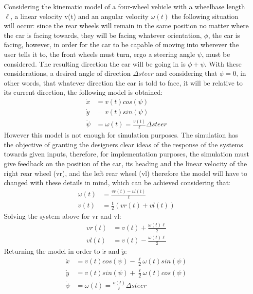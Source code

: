 Considering the kinematic model of a four-wheel vehicle with a wheelbase length $\ell$, a linear velocity v(t) and an angular velocity $\omega(t)$ the following situation will occur: since the rear wheels will remain in the same position no matter where the car is facing towards, they will be facing whatever orientation, $\phi$, the car is facing, however, in order for the car to be capable of moving into wherever the user tells it to, the front wheels must turn, ergo a steering angle $\psi$, must be considered. The resulting direction the car will be going in is $\phi + \psi$. With these considerations, a desired angle of direction $\Delta steer$ and considering that $\phi=0$, in other words, that whatever direction the car is told to face, it will be relative to its current direction, the following model is obtained:
\begin{align}
\dot{x}&=v(t) cos(\psi)\\
\dot{y}&=v(t) sin(\psi)\\
\dot{\psi}&=\omega(t)=\frac{v(t)}{\ell}\Delta steer
\end{align}
However this model is not enough for simulation purposes. The simulation has the objective of granting the designers clear ideas of the response of the systems towards given inputs, therefore, for implementation purposes, the simulation must give feedback on the position of the car, its heading and the linear velocity of the right rear wheel (vr), and the left rear wheel (vl) therefore the model will have to changed with these details in mind, which can be achieved considering that:
\begin{align}
\omega(t)&=\frac{vr(t)-vl(t)}{\ell}\\
v(t)&=\frac{1}{2}(vr(t)+vl(t))
\end{align}
Solving the system above for vr and vl:
\begin{align}
vr(t)&=v(t)+ \frac{\omega(t)\ell}{2}\\
vl(t)&=v(t)-\frac{\omega(t)\ell}{2}
\end{align}
Returning the model in order to $\dot{x}$ and $ \dot{y}$:
\begin{align}
\dot{x}&=v(t) cos(\psi)-\frac{\ell}{2}\omega(t) sin(\psi)\\
\dot{y}&=v(t) sin(\psi)+\frac{\ell}{2}\omega(t) cos(\psi)\\
\dot{\psi}&=\omega(t)=\frac{v(t)}{\ell}\Delta steer
\end{align}
